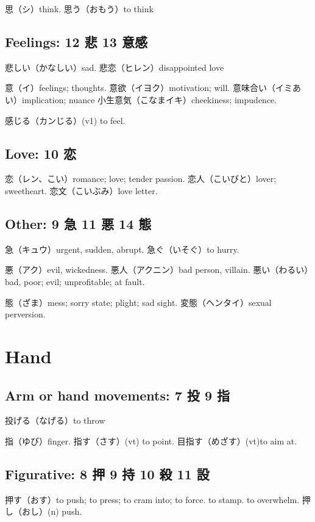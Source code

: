 思（シ）think.
思う（おもう）to think

\subsection{Feelings: 12 悲 13 意感}

悲しい（かなしい）sad.
悲恋（ヒレン）disappointed love

意（イ）feelings; thoughts.
意欲（イヨク）motivation; will.
意味合い（イミあい）implication; nuance
小生意気（こなまイキ）cheekiness; impudence.

感じる（カンじる）(v1) to feel.

\subsection{Love: 10 恋}

恋（レン、こい）romance; love; tender passion.
恋人（こいびと）lover; sweetheart.
恋文（こいぶみ）love letter.

\subsection{Other: 9 急 11 悪 14 態}

急（キュウ）urgent, sudden, abrupt.
急ぐ（いそぐ）to hurry.

悪（アク）evil, wickedness.
悪人（アクニン）bad person, villain.
悪い（わるい）bad, poor; evil; unprofitable; at fault.

態（ざま）mess; sorry state; plight; sad sight.
変態（ヘンタイ）sexual perversion.

\section{Hand}

\subsection{Arm or hand movements: 7 投 9 指}

投げる（なげる）to throw

指（ゆび）finger.
指す（さす）(vt) to point.
目指す（めざす）(vt)to aim at.

\subsection{Figurative: 8 押 9 持 10 殺 11 設}

押す（おす）to push; to press; to cram into; to force.
to stamp.
to overwhelm.
押し（おし）(n) push.

